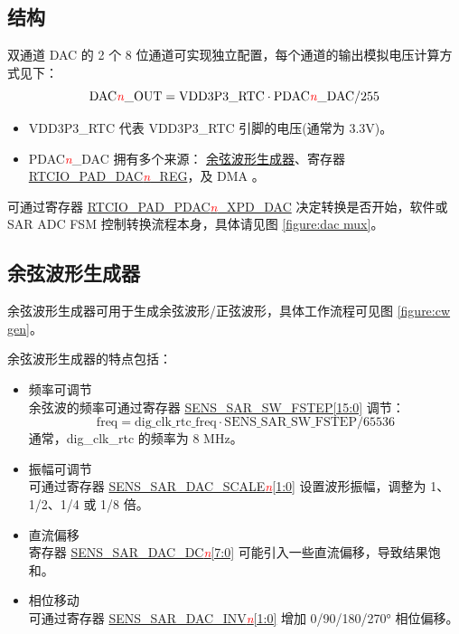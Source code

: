 \documentclass[main\_\_CN.tex]{subfiles}
\begin{document}
\subsection{结构}\label{sec:structure}

双通道 DAC 的 2 个 8 位通道可实现独立配置，每个通道的输出模拟电压计算方式见下：
$$\mathrm{DAC\textcolor{red}{\it{n}}\_OUT = VDD3P3\_RTC \cdot PDAC\textcolor{red}{\it{n}}\_DAC / 255}$$

\begin{itemize}
    \item VDD3P3\_RTC 代表 VDD3P3\_RTC 引脚的电压(通常为 3.3V)。
    \item PDAC\textcolor{red}{\it{n}}\_DAC 拥有多个来源： \hyperref[ssec:cosine gen]{余弦波形生成器}、寄存器 \hyperref[regdesc:RTCIOPADDAC1REG]{RTCIO\_PAD\_DAC\textcolor{red}{\it{n}}\_REG}，及 DMA 。
\end{itemize}

可通过寄存器 \hyperref[regdesc:RTCIOPADDAC1REG]{RTCIO\_PAD\_PDAC\textcolor{red}{\it{n}}\_XPD\_DAC} 决定转换是否开始，软件或 SAR ADC FSM 控制转换流程本身，具体请见图 \ref{figure:dac mux}。

\subsection{余弦波形生成器}
\label{ssec:cosine gen}

余弦波形生成器可用于生成余弦波形/正弦波形，具体工作流程可见图 \ref{figure:cw gen}。

余弦波形生成器的特点包括：
\begin{itemize}
    \item 频率可调节\\
    余弦波的频率可通过寄存器 \hyperref[regdesc:SENSSARDACCTRL1REG]{SENS\_SAR\_SW\_FSTEP[15:0]} 调节：
    $$\mathrm{freq = dig\_clk\_rtc\_freq \cdot SENS\_SAR\_SW\_FSTEP / 65536}$$
    通常，dig\_clk\_rtc 的频率为 8 MHz。
    \item 振幅可调节\\
    可通过寄存器 \hyperref[regdesc:SENSSARDACCTRL2REG]{SENS\_SAR\_DAC\_SCALE\textcolor{red}{\it{n}}[1:0]} 设置波形振幅，调整为 1、1/2、1/4 或 1/8 倍。
    \item 直流偏移\\
    寄存器 \hyperref[regdesc:SENSSARREADCTRL2REG]{SENS\_SAR\_DAC\_DC\textcolor{red}{\it{n}}[7:0]} 可能引入一些直流偏移，导致结果饱和。
    \item 相位移动\\
    可通过寄存器 \hyperref[regdesc:SENSSARDACCTRL2REG]{SENS\_SAR\_DAC\_INV\textcolor{red}{\it{n}}[1:0]} 增加 0/90/180/270° 相位偏移。
\end{itemize}
\end{document}
